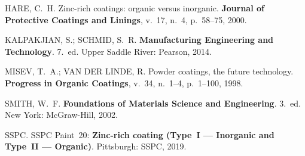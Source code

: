\documentclass[
  12pt,
  a4paper,
  oneside,
  brazil,
  chapter=TITLE
]{article}
\begin{document}
\noindent HARE, C.~H. Zinc-rich coatings: organic versus inorganic.
\textbf{Journal of Protective Coatings and Linings}, v.~17, n.~4, p.~58--75,
2000.

\noindent KALPAKJIAN, S.; SCHMID, S.~R.
\textbf{Manufacturing Engineering and Technology}. 7.~ed. Upper Saddle
River: Pearson, 2014.

\noindent MISEV, T.~A.; VAN DER LINDE, R. Powder coatings, the future
technology. \textbf{Progress in Organic Coatings}, v.~34, n.~1--4,
p.~1--100, 1998.

\noindent SMITH, W.~F. \textbf{Foundations of Materials Science and
Engineering}. 3.~ed. New York: McGraw-Hill, 2002.

\noindent SSPC. SSPC Paint~20: \textbf{Zinc-rich coating (Type~I --- Inorganic
and Type~II --- Organic)}. Pittsburgh: SSPC, 2019.
\end{document}
